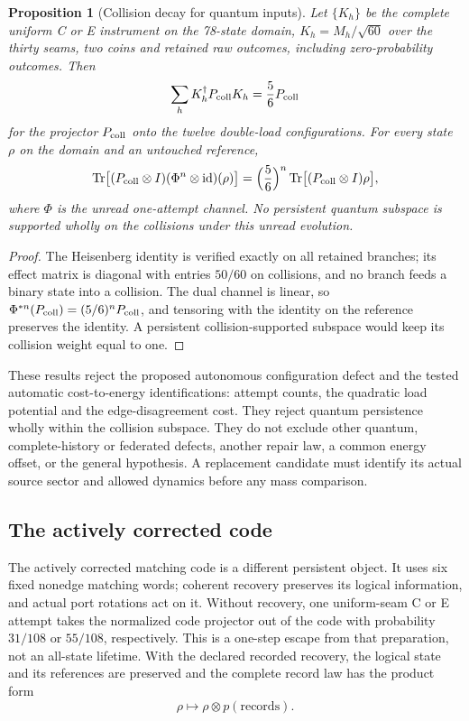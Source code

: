 \documentclass[11pt]{article}
\newtheorem{proposition}[theorem]{Proposition}
\begin{document}
\begin{proposition}[Collision decay for quantum inputs]
\label{prop:collision-decay}
Let \(\{K_h\}\) be the complete uniform C or E instrument on the 78-state
domain, \(K_h=M_h/\sqrt{60}\) over the thirty seams, two coins and retained
raw outcomes, including zero-probability outcomes. Then
\[
 \sum_hK_h^\dagger P_{\rm coll}K_h=\frac56P_{\rm coll}
\]
for the projector \(P_{\rm coll}\) onto the twelve double-load
configurations. For every state \(\rho\) on the domain and an untouched
reference,
\[
 \operatorname{Tr}\bigl[(P_{\rm coll}\otimes I)(\Phi^n\otimes\mathrm{id})
 (\rho)\bigr]
 =\Bigl(\frac56\Bigr)^n
 \operatorname{Tr}\bigl[(P_{\rm coll}\otimes I)\rho\bigr],
\]
where \(\Phi\) is the unread one-attempt channel. No persistent quantum subspace is supported wholly on the
collisions under this
unread evolution.
\end{proposition}

\begin{proof}
The Heisenberg identity is verified exactly on all retained branches; its
effect matrix is diagonal with entries \(50/60\) on collisions, and no branch
feeds a binary state into a collision. The dual channel is linear, so
\(\Phi^{*n}(P_{\rm coll})=(5/6)^nP_{\rm coll}\), and tensoring with the
identity on the reference preserves the identity. A persistent
collision-supported subspace would keep its collision weight equal to one.
\end{proof}

These results reject the proposed autonomous configuration defect and the
tested automatic cost-to-energy identifications: attempt counts, the
quadratic load potential and the edge-disagreement cost. They reject
quantum persistence wholly within the collision subspace. They do not
exclude other quantum, complete-history or federated defects, another
repair law, a common energy offset, or the general hypothesis. A replacement
candidate must identify its actual source sector and allowed dynamics before
any mass comparison.

\subsection{The actively corrected code}

The actively corrected matching code is a different persistent object. It
uses six fixed nonedge matching words; coherent recovery preserves its
logical information, and actual port rotations act on it. Without recovery,
one uniform-seam C or E attempt takes the normalized code projector out of
the code with probability \(31/108\) or \(55/108\), respectively. This is a
one-step escape from that preparation, not an all-state lifetime. With the
declared recorded recovery, the logical state and its references are
preserved and the complete record law has the product form
\[
 \rho\longmapsto\rho\otimes p(\mathrm{records}).
\]
\end{document}
